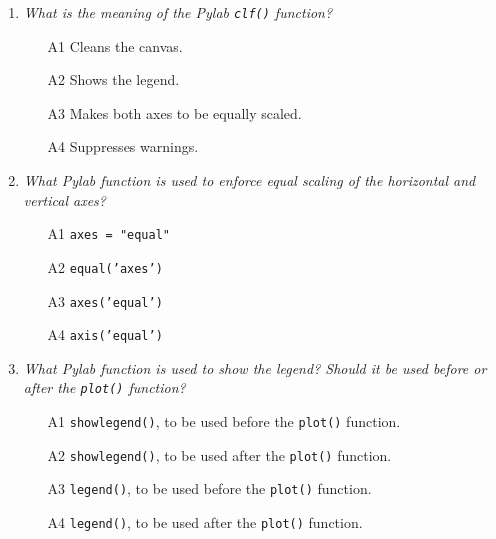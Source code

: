\begin{enumerate}
\begin{enumerate}
\item[A1] {\tt [0  0  0]}
\item[A2] {\tt [0  0  0  0]}
\item[A3] {\tt [0  1  0  -1  0]}
\item[A4] {\tt [0  0  0  0  0]}
\end{enumerate}

\vspace{6mm}

\item {\em What is the meaning of the Pylab {\tt clf()} function?}\\

\begin{enumerate}
\item[A1] Cleans the canvas. 
\item[A2] Shows the legend.
\item[A3] Makes both axes to be equally scaled.
\item[A4] Suppresses warnings.
\end{enumerate}

\vspace{6mm}

\item {\em What Pylab function is used to enforce equal scaling of the horizontal and 
vertical axes?}\\

\begin{enumerate}
\item[A1] {\tt axes = "equal"}
\item[A2] {\tt equal('axes')}
\item[A3] {\tt axes('equal')}
\item[A4] {\tt axis('equal')}
\end{enumerate}

\vspace{6mm}

\item {\em What Pylab function is used to show the legend? Should it be used before or after 
the {\tt plot()} function?}\\

\begin{enumerate}
\item[A1] {\tt showlegend()}, to be used before the {\tt plot()} function.
\item[A2] {\tt showlegend()}, to be used after the {\tt plot()} function.
\item[A3] {\tt legend()}, to be used before the {\tt plot()} function.
\item[A4] {\tt legend()}, to be used after the {\tt plot()} function.
\end{enumerate}


\end{enumerate}
